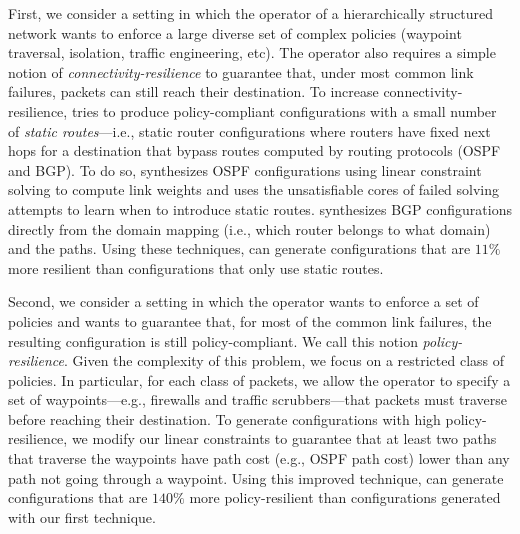 First, we consider a setting in which the operator of a hierarchically
structured network wants to enforce a large diverse set of complex
policies (waypoint traversal, isolation, traffic engineering, etc).
The operator also requires a simple notion of
\emph{connectivity-resilience} to guarantee that, under most common
link failures, packets can still reach their destination.
To increase connectivity-resilience, \name tries to produce
policy-compliant configurations with a small number of {\em static
  routes}---i.e., static router configurations where routers have
fixed next hops for a destination that bypass routes computed by routing protocols (OSPF and BGP).
To do so, \name synthesizes OSPF configurations using linear constraint solving to compute
link weights and uses the unsatisfiable cores
of failed solving attempts to learn when to introduce static routes.
\name synthesizes BGP configurations directly from the domain mapping (i.e., which router belongs to what domain) and the paths.
Using these techniques, \name can generate configurations that are
$11\%$ more resilient than configurations that only use static routes.

Second, we consider a setting in which the operator wants to enforce a
set of policies and wants to guarantee that, for most of the common
link failures, the resulting configuration is still policy-compliant.
We call this notion \emph{policy-resilience}.  Given the complexity of
this problem, we focus on a {\rm restricted class} of policies.  In
particular, for each class of packets, we allow the operator to
specify a set of waypoints---e.g., firewalls and traffic
scrubbers---that packets must traverse before reaching their
destination.  To generate configurations with high policy-resilience,
we modify our linear constraints to guarantee that at least two paths
that traverse the waypoints have path cost (e.g., OSPF path cost)
lower than any path not going through a waypoint.  Using this improved
technique, \name can generate configurations that are $140\%$ more
policy-resilient than configurations generated with our first
technique.

